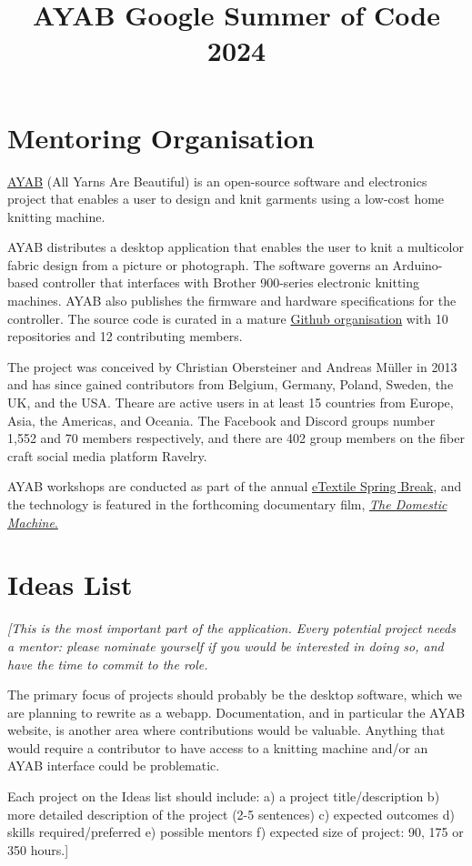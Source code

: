 \documentclass{article}
\title{AYAB Google Summer of Code 2024}
\author{\color{red}{\textbf{Application Deadline: Feb 6, 2024}}}
\begin{document}
\maketitle

\section{Mentoring Organisation}

\href{https://ayab-knitting.com/}{AYAB} (All Yarns Are Beautiful) is an open-source software and electronics project that enables a user to design and knit garments using a low-cost home knitting machine. 

AYAB distributes a desktop application that enables the user to knit a multicolor fabric design from a picture or photograph. The software governs an Arduino-based controller that interfaces with Brother 900-series electronic knitting machines. AYAB also publishes the firmware and hardware specifications for the controller. The source code is curated in a mature \href{https://github.com/AllYarnsAreBeautiful}{Github organisation} with 10 repositories and 12 contributing members.

The project was conceived by Christian Obersteiner and Andreas M{\"u}ller in 2013 and has since gained contributors from Belgium, Germany, Poland, Sweden, the UK, and the USA. Theare are active users in at least 15 countries from Europe, Asia, the Americas, and Oceania. The Facebook and Discord groups number 1,552 and 70 members respectively, and there are 402 group members on the fiber craft social media platform Ravelry.

AYAB workshops are conducted as part of the annual \href{http://etextilespringbreak.org/}{eTextile Spring Break}, and the technology is featured in the forthcoming documentary film, \href{https://www.thedomesticmachine.com/}{\textit{The Domestic Machine}.}



\section{Ideas List}

{\itshape
[This is the most important part of the application. Every potential project needs a mentor: please nominate yourself if you would be interested in doing so, and have the time to commit to the role.

The primary focus of projects should probably be the desktop software, which we are planning to rewrite as a webapp. Documentation, and in particular the AYAB website, is another area where contributions would be valuable. Anything that would require a contributor to have access to a knitting machine and/or an AYAB interface could be problematic.

Each project on the Ideas list should include: a) a project title/description b) more detailed description of the project (2-5 sentences) c) expected outcomes d) skills required/preferred e) possible mentors f) expected size of project: 90, 175 or 350 hours.]
}
\end{document}
